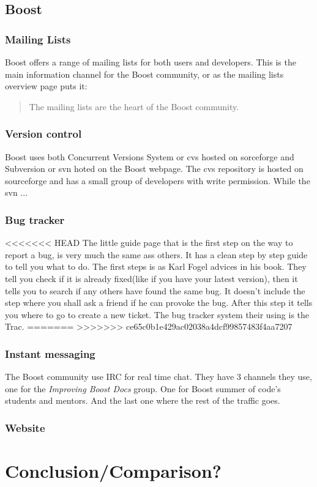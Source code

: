 \documentclass{report} %
\begin{document}
\subsection{Boost}
\subsubsection{Mailing Lists}
Boost offers a range of mailing lists\cite{boostmaillists} for both users and developers. This is the main information channel for the Boost community, or as the mailing lists overview page\cite{boostmaillists} puts it:
\begin{quote}
The mailing lists are the heart of the Boost community.
\end{quote}
\subsubsection{Version control}
Boost uses both Concurrent Versions System or cvs hosted on sorceforge\cite{boostcvssourceforge} and Subversion or svn hoted on the Boost webpage\cite{boostsvn}. The cvs repository is hosted on sourceforge and has a small group of developers with write permission. While the svn ...

\subsubsection{Bug tracker}
<<<<<<< HEAD
The little guide page that is the first step on the way to report a bug, is very much the same ass others. It has a clean step by step guide to tell you what to do. The first steps is as Karl Fogel advices in his book\cite{kfposs}. They tell you check if it is already fixed(like if you have your latest version), then it tells you to search if any others have found the same bug. It doesn't include the step where you shall ask a friend if he can provoke the bug. After this step it tells you where to go to create a new ticket. The bug tracker system their using is the Trac. 
=======
>>>>>>> ce65c0b1e429ac02038a4dcf99857483f4aa7207

\subsubsection{Instant messaging}
The Boost community use IRC for real time chat. They have 3 channels they use, one for the \emph{Improving Boost Docs} group. One for Boost summer of code's students and mentors. And the last one where the rest of the traffic goes.
\subsubsection{Website}

\section{Conclusion/Comparison?}


\end{document}
